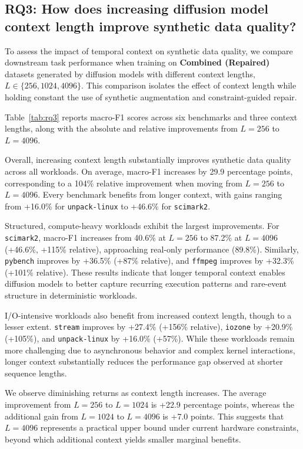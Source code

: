 \subsection{RQ3: How does increasing diffusion model context length improve synthetic data quality?}
\label{sec:rq3}

To assess the impact of temporal context on synthetic data quality, we compare downstream task performance when training on \textbf{Combined (Repaired)} datasets generated by diffusion models with different context lengths, $L \in \{256, 1024, 4096\}$. This comparison isolates the effect of context length while holding constant the use of synthetic augmentation and constraint-guided repair.

Table~\ref{tab:rq3} reports macro-F1 scores across six benchmarks and three context lengths, along with the absolute and relative improvements from $L=256$ to $L=4096$.


Overall, increasing context length substantially improves synthetic data quality across all workloads. On average, macro-F1 increases by 29.9 percentage points, corresponding to a 104\% relative improvement when moving from $L=256$ to $L=4096$. Every benchmark benefits from longer context, with gains ranging from +16.0\% for \texttt{unpack-linux} to +46.6\% for \texttt{scimark2}.

Structured, compute-heavy workloads exhibit the largest improvements. For \texttt{scimark2}, macro-F1 increases from 40.6\% at $L=256$ to 87.2\% at $L=4096$ (+46.6\%, +115\% relative), approaching real-only performance (89.8\%). Similarly, \texttt{pybench} improves by +36.5\% (+87\% relative), and \texttt{ffmpeg} improves by +32.3\% (+101\% relative). These results indicate that longer temporal context enables diffusion models to better capture recurring execution patterns and rare-event structure in deterministic workloads.


I/O-intensive workloads also benefit from increased context length, though to a lesser extent. \texttt{stream} improves by +27.4\% (+156\% relative), \texttt{iozone} by +20.9\% (+105\%), and \texttt{unpack-linux} by +16.0\% (+57\%). While these workloads remain more challenging due to asynchronous behavior and complex kernel interactions, longer context substantially reduces the performance gap observed at shorter sequence lengths.

We observe diminishing returns as context length increases. The average improvement from $L=256$ to $L=1024$ is +22.9 percentage points, whereas the additional gain from $L=1024$ to $L=4096$ is +7.0 points. This suggests that $L=4096$ represents a practical upper bound under current hardware constraints, beyond which additional context yields smaller marginal benefits.

